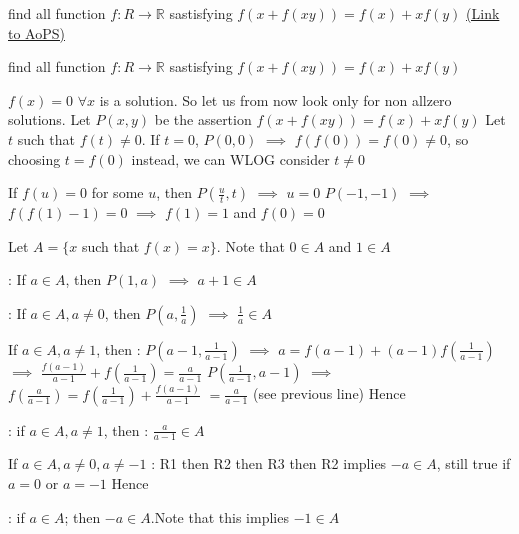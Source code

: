 \begin{problem}
	find all function $ f: R\rightarrow\mathbb{R} $ sastisfying 
$ f(x+f(xy))=f(x)+xf(y) $
	\flushright \href{https://artofproblemsolving.com/community/c6h608997}{(Link to AoPS)}
\end{problem}



\begin{solution}
	\begin{tcolorbox}find all function $ f: R\rightarrow\mathbb{R} $ sastisfying 
$ f(x+f(xy))=f(x)+xf(y) $\end{tcolorbox}
$\boxed{f(x)=0}$ $\forall x$ is a solution. So let us from now look only for non allzero solutions.
Let $P(x,y)$ be the assertion $f(x+f(xy))=f(x)+xf(y)$
Let $t$ such that $f(t)\ne 0$. If $t=0$, $P(0,0)$ $\implies$ $f(f(0))=f(0)\ne 0$, so choosing $t=f(0)$ instead, we can WLOG consider $t\ne 0$

If $f(u)=0$ for some $u$, then $P(\frac ut,t)$ $\implies$ $u=0$
$P(-1,-1)$ $\implies$ $f(f(1)-1)=0$ $\implies$ $f(1)=1$ and $f(0)=0$

Let $A=\{x$ such that $f(x)=x\}$. Note that $0\in A$ and $1\in A$

 : If $a\in A$, then $P(1,a)$ $\implies$ $a+1\in A$

 : If $a\in A,a\ne 0$, then $P(a,\frac 1a)$ $\implies$ $\frac 1a\in A$

If $a\in A,a\ne 1$, then :
$P(a-1,\frac 1{a-1})$ $\implies$ $a=f(a-1)+(a-1)f(\frac 1{a-1})$ $\implies$ $\frac{f(a-1)}{a-1}+f(\frac 1{a-1})=\frac a{a-1}$
$P(\frac 1{a-1},a-1)$ $\implies$ $f(\frac a{a-1})=f(\frac 1{a-1})+\frac {f(a-1)}{a-1}$ $=\frac a{a-1}$ (see previous line)
Hence  : if $a\in A,a\ne 1$, then : $\frac a{a-1}\in A$

If $a\in A,a\ne 0, a\ne -1$ : R1 then R2 then R3 then R2 implies $-a\in A$, still true if $a=0$ or $a=-1$
Hence  : if $a\in A$; then $-a\in A$.Note that this implies $-1\in A$


\end{solution}
